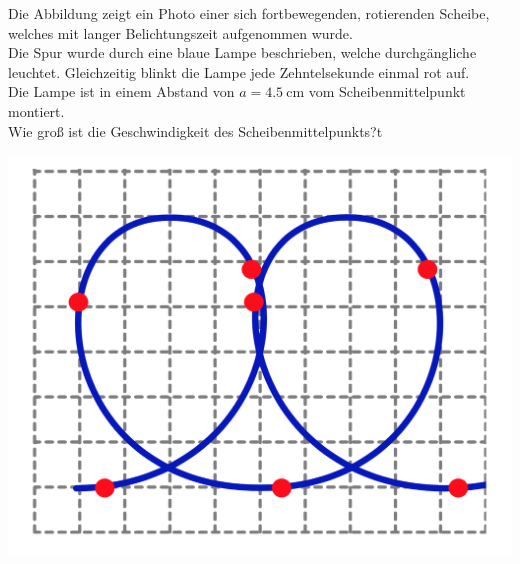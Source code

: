 \flushleft
\begin{minipage}{.75\textwidth}
\begin{Exercise}[label = rotdisk, title = Rotierende Scheibe, difficulty = 2, origin = Jaan Kalda ]
Die Abbildung zeigt ein Photo einer sich fortbewegenden, rotierenden Scheibe, welches mit langer Belichtungszeit aufgenommen wurde.\\
Die Spur wurde durch eine blaue Lampe beschrieben, welche durchgängliche leuchtet. Gleichzeitig blinkt die Lampe jede  Zehntelsekunde einmal rot auf.\\
Die Lampe ist in einem Abstand von $a =4.5~\mathrm{cm}$ vom Scheibenmittelpunkt montiert.\\
Wie groß ist die Geschwindigkeit des Scheibenmittelpunkts?t
\end{Exercise}
\end{minipage}
\hfill
\begin{minipage}{.2\textwidth}
	\centering
\includegraphics[scale = .2]{../tasks/kalda/rotdisk.png}
\end{minipage}
